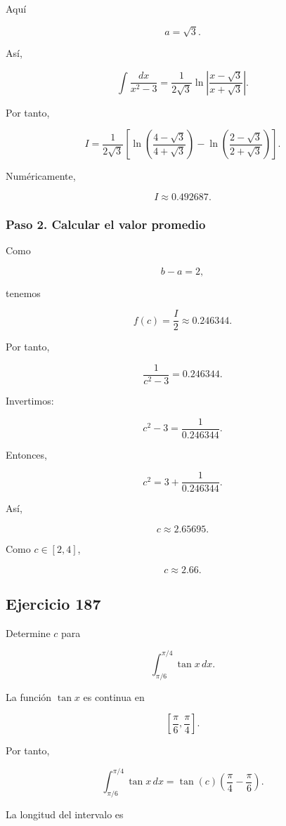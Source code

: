 \documentclass[12pt]{article}
\begin{document}
Aquí

\[
a=\sqrt3.
\]

Así,

\[
\int\frac{dx}{x^2-3}
=
\frac{1}{2\sqrt3}
\ln\left|
\frac{x-\sqrt3}{x+\sqrt3}
\right|.
\]

Por tanto,

\[
I=
\frac{1}{2\sqrt3}
\left[
\ln\left(
\frac{4-\sqrt3}{4+\sqrt3}
\right)
-
\ln\left(
\frac{2-\sqrt3}{2+\sqrt3}
\right)
\right].
\]

Numéricamente,

\[
I\approx0.492687.
\]

\subsubsection*{Paso 2. Calcular el valor promedio}

Como

\[
b-a=2,
\]

tenemos

\[
f(c)
=
\frac{I}{2}
\approx
0.246344.
\]

Por tanto,

\[
\frac{1}{c^2-3}
=
0.246344.
\]

Invertimos:

\[
c^2-3
=
\frac{1}{0.246344}.
\]

Entonces,

\[
c^2
=
3+\frac{1}{0.246344}.
\]

Así,

\[
c
\approx2.65695.
\]

Como \(c\in[2,4]\),

\[
\boxed{c\approx2.66}.
\]

\subsection*{Ejercicio 187}

Determine \(c\) para

\[
\int_{\pi/6}^{\pi/4}\tan x\,dx.
\]

La función \(\tan x\) es continua en

\[
\left[\frac{\pi}{6},\frac{\pi}{4}\right].
\]

Por tanto,

\[
\int_{\pi/6}^{\pi/4}\tan x\,dx
=
\tan(c)
\left(
\frac{\pi}{4}-\frac{\pi}{6}
\right).
\]

La longitud del intervalo es
\end{document}
